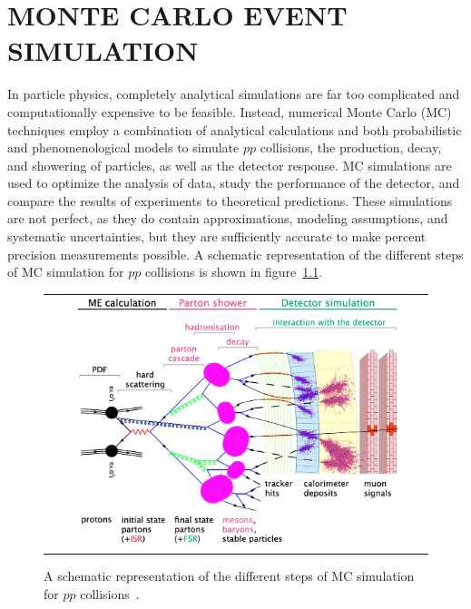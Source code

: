 
\chapter{MONTE CARLO EVENT SIMULATION}
\label{Monte_Carlo_Event_Simulation}
In particle physics, completely analytical simulations are far too complicated and computationally expensive to be feasible.
Instead, numerical Monte Carlo (MC) techniques employ a combination of analytical calculations and both probabilistic and phenomenological models to simulate $pp$ collisions, the production, decay, and showering of particles, as well as the detector response.
MC simulations are used to optimize the analysis of data, study the performance of the detector, and compare the results of experiments to theoretical predictions.
These simulations are not perfect, as they do contain approximations, modeling assumptions, and systematic uncertainties, but they are sufficiently accurate to make percent precision measurements possible.
A schematic representation of the different steps of MC simulation for $pp$ collisions is shown in figure~\ref{MC_simulation}.
\begin{figure}[htb]
  \begin{center}
    \begin{tabular}{c}
        \includegraphics[width=0.9\textwidth]{fig_Event_Simulation/MC_simulation.png}
    \end{tabular}
    \caption{A schematic representation of the different steps of MC simulation for $pp$ collisions~\cite{bartosik}.
            }
    \label{MC_simulation}
  \end{center}
\end{figure}

